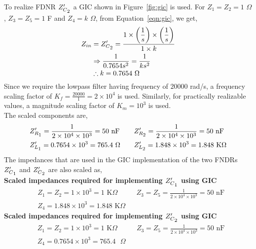 \documentclass{lab_sheet}
\newcommand\ddfrac[2]{\frac{\displaystyle #1}{\displaystyle #2}}
\begin{document}
    To realize FDNR $Z'_{C\textsubscript{$2$}}$ a GIC shown in Figure~\ref{fig:gic} is used. For $Z_1=Z_2=1$ $\Omega$, $Z_3=Z_5=1$ F and $Z_4=k$ $\Omega$, from Equation~\ref{eqn:gic}, we get,
    \begin{equation*}
        \begin{aligned}
            Z_{in}&=Z'_{C\textsubscript{$2$}}=\ddfrac{1\times\left(\frac{1}{s}\right)\times\left(\frac{1}{s}\right)}{1\times k}\\
            &\Rightarrow \frac{1}{0.7654s^2}=\frac{1}{ks^2}\\
            &\therefore k=0.7654 \text{ }\Omega
        \end{aligned}
    \end{equation*}
    Since we require the lowpass filter having frequency of $20000$ rad/s, a frequency scaling factor of $K_f=\ddfrac{20000}{1}=2\times 10^4$ is used. Similarly, for practically realizable values, a magnitude scaling factor of $K_m=10^3$ is used.\\ The scaled components are,
    \begin{equation*}
        \begin{aligned}
           & Z'_{R\textsubscript{$1$}}=\frac{1}{2\times 10^4\times10^3}=50\text{ nF}\quad && Z'_{R\textsubscript{$2$}}=\frac{1}{2\times 10^4\times10^3}=50\text{ nF}\\
           & Z'_{L\textsubscript{$1$}}=0.7654\times10^3=765.4\text{ }\Omega \quad && Z'_{L\textsubscript{$2$}}=1.848\times10^3=1.848\text{ K}\Omega
        \end{aligned}
    \end{equation*}
    The impedances that are used in the GIC implementation of the two FNDRs $Z'_{C\textsubscript{$1$}}$ and $Z'_{C\textsubscript{$2$}}$ are also scaled as,\\
    \textbf{Scaled impedances required for implementing $Z'_{C\textsubscript{$1$}}$ using GIC}
    \begin{equation*}
        \begin{aligned}
            & Z_1=Z_2=1\times10^3=1\text{ K}\Omega \quad && Z_3=Z_5=\frac{1}{2\times10^4\times10^3}=50\text{ nF}\\
            &Z_4=1.848\times10^3=1.848\text{ K}\Omega
        \end{aligned}
    \end{equation*}
    \textbf{Scaled impedances required for implementing $Z'_{C\textsubscript{$2$}}$ using GIC}
    \begin{equation*}
        \begin{aligned}
            & Z_1=Z_2=1\times10^3=1\text{ K}\Omega \quad && Z_3=Z_5=\frac{1}{2\times10^4\times10^3}=50\text{ nF}\\
            &Z_4=0.7654\times10^3=765.4\text{ }\Omega
        \end{aligned}
    \end{equation*}
\end{document}
